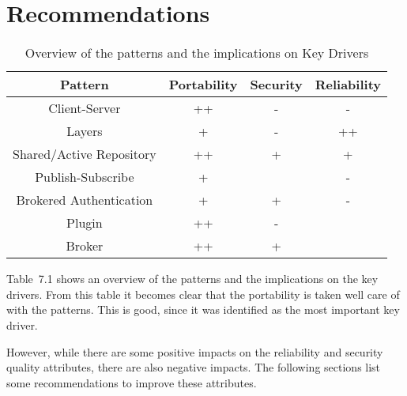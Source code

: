 
\clearpage
\chapter{Recommendations}
\label{ch:recommendations}
%

\begin{center}
\begin{table}[H]
\label{overview}
\caption{Overview of the patterns and the implications on Key Drivers}
\begin{tabular}{|c|c|c|c|}
\hline \textbf{Pattern} & \textbf{Portability} & \textbf{Security} & \textbf{Reliability} \\ 
\hline Client-Server & ++ & - & - \\ 
\hline Layers & + & - & ++ \\ 
\hline Shared/Active Repository & ++ & + & + \\ 
\hline Publish-Subscribe & + &  & - \\ 
\hline Brokered Authentication & + & + & - \\ 
\hline Plugin & ++ & - &  \\ 
\hline Broker & ++ & + &  \\ 
\hline 
\end{tabular} 

\end{table}
\end{center}
Table~7.1 shows an overview of the patterns and the implications on the key drivers. From this table it becomes clear that the portability is taken well care of with the patterns. This is good, since it was identified as the most important key driver.

However, while there are some positive impacts on the reliability and security quality attributes, there are also negative impacts. The following sections list some recommendations to improve these attributes.

